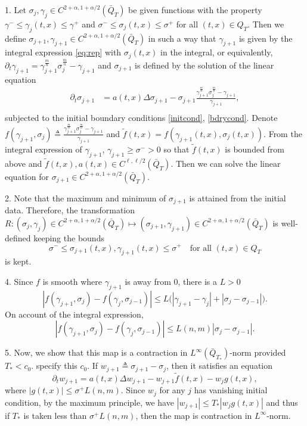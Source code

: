 \documentclass[a4paper,11pt]{article}
\def\blue{\color{blue}}
\theoremstyle{remark}
\begin{document}
1. Let $\sigma_{j},\gamma_{j}\in C^{2+\alpha,1+\alpha/2}(\bar{Q}_T)$ be given functions with the property $\gamma^- \le \gamma_j(t,x) \le \gamma^+$ and $\sigma^- \le \sigma_j(t,x) \le \sigma^+$ for all $(t,x)\in Q_T$. Then we define $\sigma_{j+1},\gamma_{j+1}\in C^{2+\alpha,1+\alpha/2}(\bar{Q}_T)$ in such a way that 
$\gamma_{j+1}$ is given by the integral expression \eqref{eq:rep} with $\sigma_{j}(t,x)$ in the integral, or equivalently,  $\partial_t\gamma_{j+1} = \gamma_{j+1}^{\frac{m}{n}}\sigma_j^{\frac{m}{n}} - \gamma_{j+1}$ and $\sigma_{j+1}$ is defined by the solution of the linear equation
 \begin{equation}\label{aux2}
 \begin{aligned}
 \partial_t \sigma_{j+1} &= a(t,x) \Delta \sigma_{j+1} -\sigma_{j+1}\frac{\gamma_{j+1}^{\frac{m}{n}}\sigma_j^{\frac{m}{n}} - \gamma_{j+1}}{\gamma_{j+1}}, \\
 \end{aligned}
 \end{equation}
 subjected to the initial boundary conditions \eqref{initcond}, \eqref{bdrycond}. Denote $f(\gamma_{j+1},\sigma_j)\triangleq\frac{\gamma_{j+1}^{\frac{m}{n}}\sigma_j^{\frac{m}{n}} - \gamma_{j+1}}{\gamma_{j+1}}$ and $\tilde{f}(t,x) = f(\gamma_{j+1}(t,x),\sigma_j(t,x))$. From the integral expression of $\gamma_{j+1}$, $\gamma_{j+1}\ge \sigma^- >0$ so that $\tilde{f}(t,x)$ is bounded from above and $\tilde f (t,x), a(t,x)\in C^{\ell,\ell/2}(\bar{Q}_T)$. Then we can solve the linear equation for $\sigma_{j+1}\in C^{2+\alpha,1+\alpha/2}(\bar{Q}_T)$. 
 
 2. Note that the maximum and minimum of $\sigma_{j+1}$ is attained from the initial data. Therefore, the transformation $R:(\sigma_{j},\gamma_{j})\in C^{2+\alpha,1+\alpha/2}(\bar{Q}_T) \mapsto (\sigma_{j+1},\gamma_{j+1})\in C^{2+\alpha,1+\alpha/2}(\bar{Q}_T)$ is well-defined keeping the bounds
 $$ \sigma^-\le \sigma_{j+1}(t,x),\gamma_{j+1}(t,x) \le \sigma^+\quad \text{for all $(t,x)\in Q_T$}$$
 is kept.
 

 4. Since $f$ is smooth where $\gamma_{j+1}$ is away from $0$, there is a $L>0$
 $$ |f(\gamma_{j+1},\sigma_j)- f(\gamma_{j},\sigma_{j-1})| \le L\Big(|\gamma_{j+1}-\gamma_{j}| + |\sigma_{j}-\sigma_{j-1}|\Big).$$
 On account of the integral expression,
 $$ |f(\gamma_{j+1},\sigma_j)- f(\gamma_{j},\sigma_{j-1})| \le L(n,m)|\sigma_{j}-\sigma_{j-1}|.$$
 
 5. Now, we show that this map is a contraction in $L^\infty(\bar{Q}_{T_*})$-norm provided $T_* < c_0$. {\blue specify this $c_0$.} If $w_{j+1}\triangleq \sigma_{j+1}-\sigma_{j}$, then it satisfies an equation
 $$ \partial_t w_{j+1} = a(t,x)\Delta w_{j+1} - w_{j+1}\tilde{f}(t,x) - w_{j}g(t,x),$$
 where $|g(t,x)| \le \sigma^+ L(n,m)$.
 Since $w_j$ for any $j$ has vanishing initial condition, by the maximum principle, we have
 $|w_{j+1}| \le T_*|w_j g(t,x)|$ and thus if $T_*$ is taken less than $\sigma^+ L(n,m)$, then the map is contraction in $L^\infty$-norm.
 
\end{document}

